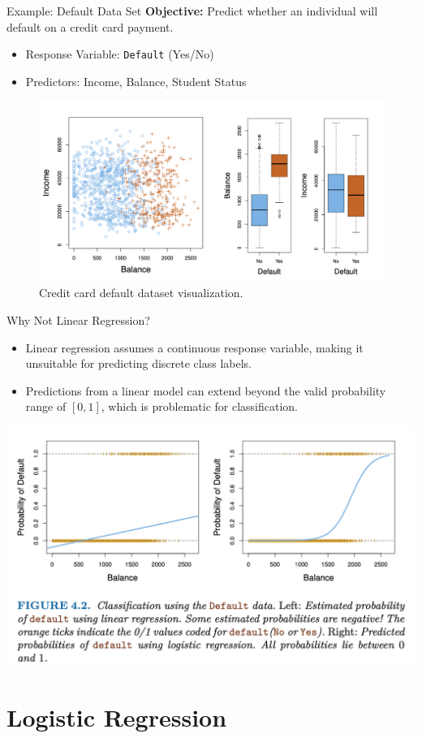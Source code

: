 \documentclass[aspectratio=169,xcolor=dvipsnames]{beamer}
\begin{document}
\begin{frame}{Example: Default Data Set}
    \textbf{Objective:} Predict whether an individual will default on a credit card payment.
    \begin{itemize}
        \item Response Variable: \texttt{Default} (Yes/No)
        \item Predictors: Income, Balance, Student Status
    \end{itemize}
    \begin{figure}
        \centering
        \includegraphics[width=0.6\linewidth]{images/default_data.png}
        \caption{Credit card default dataset visualization.}
    \end{figure}
\end{frame}

\begin{frame}{Why Not Linear Regression?}
    \begin{itemize}
        \item Linear regression assumes a continuous response variable, making it unsuitable for predicting discrete class labels.
        \item Predictions from a linear model can extend beyond the valid probability range of \([0,1]\), which is problematic for classification.
    \end{itemize}
    \centering
    \includegraphics[width=0.6\linewidth]{images/lin_logi.png}
\end{frame}
\section{Logistic Regression}
\end{document}
